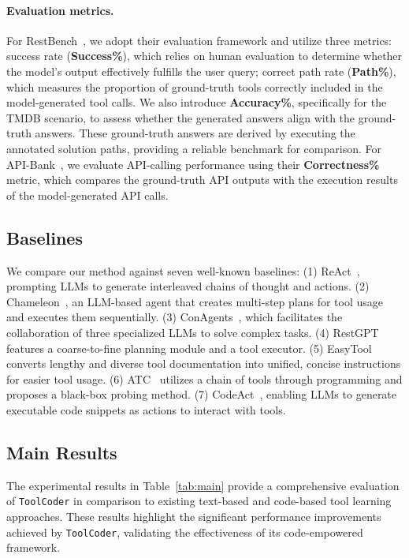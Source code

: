 \paragraph{Evaluation metrics.} For RestBench~\cite{DBLP:journals/corr/abs-2306-06624}, we adopt their evaluation framework and utilize three metrics: success rate (\textbf{Success\%}), which relies on human evaluation to determine whether the model’s output effectively fulfills the user query; correct path rate (\textbf{Path\%}), which measures the proportion of ground-truth tools correctly included in the model-generated tool calls. We also introduce \textbf{Accuracy\%}, specifically for the TMDB scenario, to assess whether the generated answers align with the ground-truth answers. These ground-truth answers are derived by executing the annotated solution paths, providing a reliable benchmark for comparison. For API-Bank~\cite{li-etal-2023-api}, we evaluate API-calling performance using their \textbf{Correctness\%} metric, which compares the ground-truth API outputs with the execution results of the model-generated API calls.

\subsection{Baselines} We compare our method against seven well-known baselines: (1) ReAct~\cite{DBLP:conf/iclr/YaoZYDSN023}, prompting LLMs to generate interleaved chains of thought and actions. (2) Chameleon~\cite{DBLP:conf/nips/LuPCGCWZG23}, an LLM-based agent that creates multi-step plans for tool usage and executes them sequentially. (3) ConAgents~\cite{shi-etal-2024-learning}, which facilitates the collaboration of three specialized LLMs to solve complex tasks. (4) RestGPT~\cite{DBLP:journals/corr/abs-2306-06624} features a coarse-to-fine planning module and a tool executor. (5) EasyTool~\cite{DBLP:journals/corr/abs-2401-06201} converts lengthy and diverse tool documentation into unified, concise instructions for easier tool usage. (6) ATC~\cite{DBLP:journals/corr/abs-2405-16533} utilizes a chain of tools through programming and proposes a black-box probing method. (7) CodeAct~\cite{DBLP:conf/icml/WangCY0L0J24}, enabling LLMs to generate executable code snippets as actions to interact with tools.

\subsection{Main Results}
The experimental results in Table~\ref{tab:main} provide a comprehensive evaluation of \texttt{ToolCoder} in comparison to existing text-based and code-based tool learning approaches. These results highlight the significant performance improvements achieved by \texttt{ToolCoder}, validating the effectiveness of its code-empowered framework.

